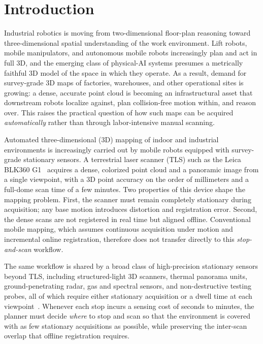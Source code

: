 \documentclass[sensors,article,submit,pdftex,moreauthors]{Definitions/mdpi}
\begin{document}

\section{Introduction}

Industrial robotics is moving from two-dimensional floor-plan reasoning toward
three-dimensional spatial understanding of the work environment. Lift robots,
mobile manipulators, and autonomous mobile robots increasingly plan and act in
full 3D, and the emerging class of physical-AI systems presumes a metrically
faithful 3D model of the space in which they operate. As a result, demand for
survey-grade 3D maps of factories, warehouses, and other operational sites is
growing: a dense, accurate point cloud is becoming an infrastructural asset that
downstream robots localize against, plan collision-free motion within, and reason
over. This raises the practical question of how such maps can be acquired
\emph{automatically} rather than through labor-intensive manual scanning.

Automated three-dimensional (3D) mapping of indoor and industrial environments
is increasingly carried out by mobile robots equipped with survey-grade
stationary sensors. A terrestrial laser scanner (TLS) such as the Leica BLK360
G1~\cite{leica-blk360} acquires a dense, colorized point cloud and a panoramic
image from a single viewpoint, with a 3D point accuracy on the order of
millimeters and a full-dome scan time of a few minutes. Two properties of this
device shape the mapping problem. First, the scanner must remain completely
stationary during acquisition; any base motion introduces distortion and
registration error. Second, the dense scans are not registered in real time but
aligned offline. Conventional mobile mapping, which assumes continuous
acquisition under motion and incremental online registration, therefore does not
transfer directly to this \emph{stop-and-scan} workflow.

The same workflow is shared by a broad class of high-precision stationary
sensors beyond TLS, including structured-light 3D scanners, thermal panorama
units, ground-penetrating radar, gas and spectral sensors, and non-destructive
testing probes, all of which require either stationary acquisition or a dwell
time at each viewpoint~\cite{stopandgo-review,gas-coverage,robotic-ndt}. Whenever
each stop incurs a sensing cost of seconds to minutes, the planner must decide
\emph{where} to stop and scan so that the environment is covered with as few
stationary acquisitions as possible, while preserving the inter-scan overlap that
offline registration requires.
\end{document}
